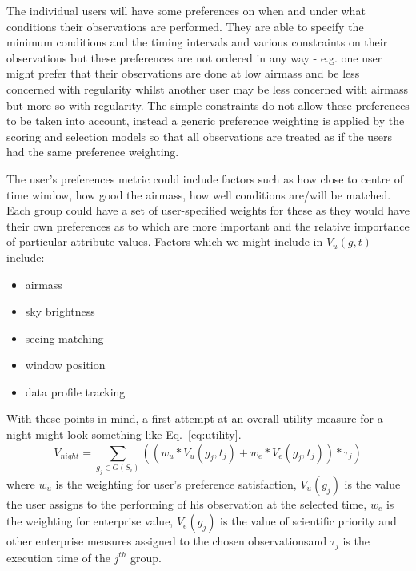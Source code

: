 \begin{itemize}
The individual users will have some preferences on when and under what conditions their observations are performed. They are able to specify the minimum conditions and the timing intervals and various constraints on their observations but these preferences are not ordered in any way - e.g. one user might prefer that their observations are done at low airmass and be less concerned with regularity whilst another user may be less concerned with airmass but more so with regularity. The simple constraints do not allow these preferences to be taken into account, instead a generic preference weighting is applied by the scoring and selection models so that all observations are treated as if the users had the same preference weighting. 

The user's preferences metric could include factors such as how close to centre of time window, how good the airmass, how well conditions are/will be matched. Each group could have a set of user-specified weights for these as they would have their own preferences as to which are more important and the relative importance of particular attribute values. Factors which we might include in $V_u(g,t)$ include:-
\begin{itemize}
\item airmass 
\item sky brightness
\item seeing matching
\item window position
\item data profile tracking
\end{itemize}

\end{itemize}



With these points in mind, a first attempt at an overall utility measure for a night might look something like Eq.~\ref{eq:utility}.
\begin{equation}
\label{eq:utility}
V_{night} = \mathop{\sum}_{g_j \in G(S_i)} ((w_{u}*V_{u}(g_j,t_j) + w_{e}*V_{e}(g_j,t_j))*\tau_j) 
\end{equation} 
where $w_{u}$ is the weighting for user's preference satisfaction, $V_{u}(g_j)$ is the value the user assigns to the performing of his observation at the selected time, $w_{e}$ is the weighting for enterprise value, $V_{e}(g_j)$ is the value of scientific priority and other enterprise measures assigned to the chosen observationsand $\tau_j$ is the execution time of the $j^{th}$ group.

